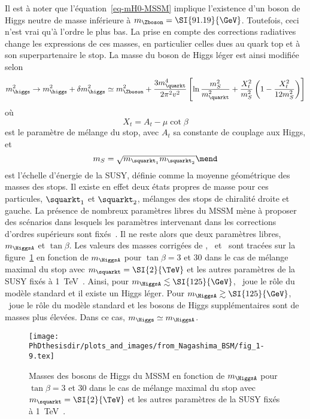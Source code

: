 Il est à noter que l'équation~\eqref{eq-mH0-MSSM} implique l'existence d'un boson de Higgs neutre de masse inférieure à $m_{\Zboson}=\SI{91.19}{\GeV}$.
Toutefois, ceci n'est vrai qu'à l'ordre le plus bas.
La prise en compte des corrections radiatives change les expressions de ces masses, en particulier celles dues au quark top et à son superpartenaire le stop.
La masse du boson de Higgs léger est ainsi modifiée selon~\cite{Nagashima_BSM}
\begin{equation}
m_{\higgs}^2 \to m_{\higgs}^2 + \delta m_{\higgs}^2
\simeq m_{\Zboson}^2
+ \frac{3 m_{\quarkt}^4}{2 \pi^2 v^2} \left[ \ln\frac{m_S^2}{m_{\quarkt}^2} + \frac{X_t^2}{m_S^2}\left(1-\frac{X_t^2}{12 m_S^2} \right) \right]
\end{equation}
où
\begin{equation}
X_t = A_t - \mu\cot\beta
\end{equation}
est le paramètre de mélange du stop,
avec $A_t$ sa constante de couplage aux Higgs,
et
\begin{equation}
m_S = \sqrt{m_{\squarkt_1}m_{\squarkt_2}}
\mend
\end{equation}
est l'échelle d'énergie de la SUSY, définie comme la moyenne géométrique des masses des stops.
Il existe en effet deux états propres de masse pour ces particules,
$\squarkt_1$ et $\squarkt_2$,
mélanges des stops de chiralité droite et gauche.
La présence de nombreux paramètres libres du MSSM mène à proposer des scénarios dans lesquels les paramètres intervenant dans les corrections d'ordres supérieurs sont fixés~\cite{Carena_2013,Bagnaschi_2019}.
Il ne reste alors que deux paramètres libres, $m_{\HiggsA}$ et $\tan\beta$.
Les valeurs des masses corrigées de \higgs, \Higgs\ et \Higgspm\ sont tracées sur la figure~\ref{fig-Higgs_corrected_masses_as_fct_of_mA_and_tanbeta} en fonction de $m_{\HiggsA}$ pour $\tan\beta=3$ et $30$ dans le cas de mélange maximal du stop avec $m_{\squarkt}=\SI{2}{\TeV}$ et les autres paramètres de la SUSY fixés à \SI{1}{\TeV}~\cite{Nagashima_BSM}.
Ainsi, pour $m_{\HiggsA} \lesssim \SI{125}{\GeV}$, \Higgs\ joue le rôle du modèle standard et il existe un Higgs léger.
Pour $m_{\HiggsA} \gtrsim \SI{125}{\GeV}$, \higgs\ joue le rôle du modèle standard et les bosons de Higgs supplémentaires sont de masses plus élevées.
Dans ce cas, $m_{\Higgs}\simeq m_{\HiggsA}$.
\begin{figure}[h]
\centering
\texttt{[image: \\PhDthesisdir/plots\_and\_images/from\_Nagashima\_BSM/fig\_1-9.tex]}
\caption[Masses des bosons de Higgs du MSSM.]{Masses des bosons de Higgs du MSSM en fonction de $m_{\HiggsA}$ pour $\tan\beta=3$ et $30$ dans le cas de mélange maximal du stop avec $m_{\squarkt}=\SI{2}{\TeV}$ et les autres paramètres de la SUSY fixés à \SI{1}{\TeV}~\cite{Nagashima_BSM}.}
\label{fig-Higgs_corrected_masses_as_fct_of_mA_and_tanbeta}
\end{figure}
